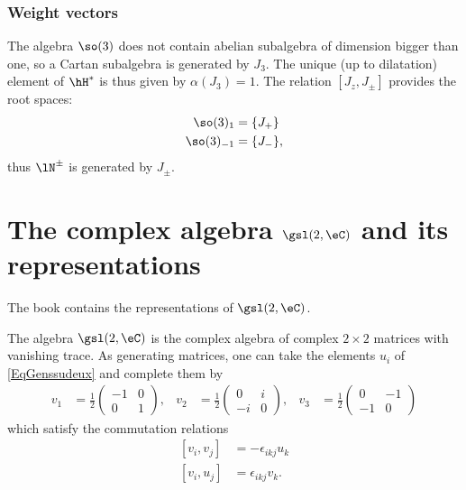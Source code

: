 \subsubsection{Weight vectors}	\label{subSubSecweightsotrois}

The algebra $\so(3)$ does not contain abelian subalgebra of dimension bigger than one, so a Cartan subalgebra is generated by $J_3$. The unique (up to dilatation) element of $\hH^*$ is thus given by $\alpha(J_3)=1$. The relation $[J_z,J_{\pm}]$ provides the root spaces:
\begin{equation}
	\begin{aligned}
		\so(3)_1	&=\{ J_+ \}\\
		\so(3)_{-1}	&=\{ J_- \},
	\end{aligned}
\end{equation}
thus $\lN^{\pm}$ is generated by $J_{\pm}$.

					\section{The complex algebra \texorpdfstring{$\protect\gsl(2,\eC)$}{sl2C} and its representations}
\label{SecsldeuxCandrepres}

The book \cite{Kassel} contains the representations of \( \gsl(2,\eC)\).

The algebra $\gsl(2,\eC)$ is the complex algebra of complex $2\times 2$ matrices with vanishing trace. As generating matrices, one can take the elements $u_i$ of \eqref{EqGenssudeux} and complete them by
\begin{align*}
v_1&=\frac{ 1 }{2}
\begin{pmatrix}
  -1	&	0	\\ 
  0	&	1	
\end{pmatrix},
&v_2&=\frac{ 1 }{2}
\begin{pmatrix}
  0	&	i	\\ 
  -i	&	0	
\end{pmatrix},
&v_3&=\frac{ 1 }{2}
\begin{pmatrix}
  0	&	-1	\\ 
  -1	&	0	
\end{pmatrix}
\end{align*}
which satisfy the commutation relations
\begin{subequations}
\begin{align}
	[v_i,v_j]&=-\epsilon_{ikj}u_k\\
	[v_i,u_j]&=\epsilon_{ikj}v_k.
\end{align}
\end{subequations}

